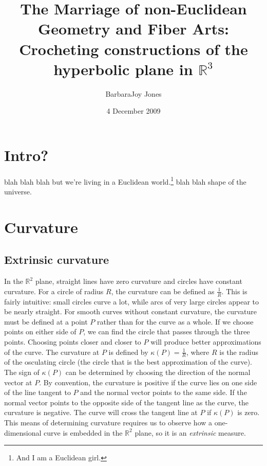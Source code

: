 \documentclass[letterpaper,titlepage]{article}
\title{The Marriage of non-Euclidean Geometry and Fiber Arts:\\
\bigskip
\Large{Crocheting constructions of the hyperbolic plane in $\mathbb{R}^3$}}
\author{BarbaraJoy Jones}
\date{4 December 2009}
\begin{document}
\maketitle

\section{Intro?}
blah blah blah but we're living in a Euclidean world.\footnote{And I am a Euclidean girl.\cite{madonna}} blah blah shape of the universe.

\section{Curvature}
\subsection{Extrinsic curvature}
In the $\mathbb{R}^2$ plane, straight lines have zero curvature and circles have constant curvature.
For a circle of radius $R$, the curvature can be defined as $\frac{1}{R}$.
This is fairly intuitive: small circles curve a lot, while arcs of very large circles appear to be nearly straight.\cite{adventures}
For smooth curves without constant curvature, the curvature must be defined at a point $P$ rather than for the curve as a whole.
If we choose points on either side of $P$, we can find the circle that passes through the three points.
Choosing points closer and closer to $P$ will produce better approximations of the curve.
The curvature at $P$ is defined by $\kappa(P) = \frac{1}{R}$, where $R$ is the radius of the osculating circle (the circle that is the best approximation of the curve).
The sign of $\kappa(P)$ can be determined by choosing the direction of the normal vector at $P$.
By convention, the curvature is positive if the curve lies on one side of the line tangent to $P$ and the normal vector points to the same side.
If the normal vector points to the opposite side of the tangent line as the curve, the curvature is negative.
The curve will cross the tangent line at $P$ if $\kappa(P)$ is zero.\cite{singer}
This means of determining curvature requires us to observe how a one-dimensional curve is embedded in the $\mathbb{R}^2$ plane, so it is an \emph{extrinsic} measure.
\end{document}
